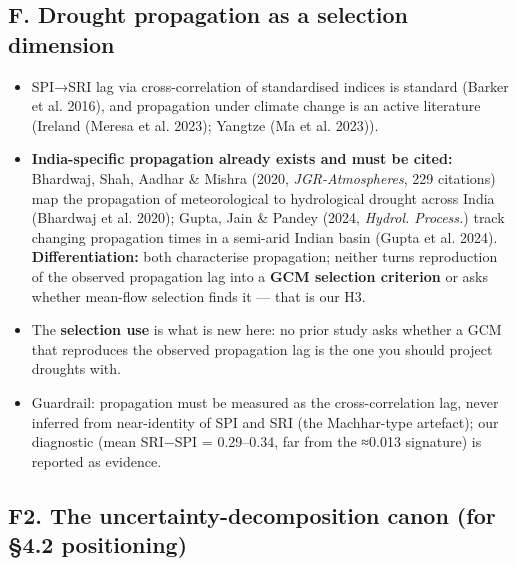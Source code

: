 \documentclass[
  11pt,
]{article}
\providecommand{\tightlist}{%
  \setlength{\itemsep}{0pt}\setlength{\parskip}{0pt}}
\begin{document}
\subsection{F. Drought propagation as a selection
dimension}\label{f.-drought-propagation-as-a-selection-dimension}

\begin{itemize}
\tightlist
\item
  SPI→SRI lag via cross-correlation of standardised indices is standard
  (Barker et al. 2016), and propagation under climate change is an
  active literature (Ireland (Meresa et al. 2023); Yangtze ({Ma et al.}
  2023)).
\item
  \textbf{India-specific propagation already exists and must be cited:}
  Bhardwaj, Shah, Aadhar \& Mishra (2020, \emph{JGR-Atmospheres}, 229
  citations) map the propagation of meteorological to hydrological
  drought across India (Bhardwaj et al. 2020); Gupta, Jain \& Pandey
  (2024, \emph{Hydrol. Process.}) track changing propagation times in a
  semi-arid Indian basin (Gupta et al. 2024). \textbf{Differentiation:}
  both characterise propagation; neither turns reproduction of the
  observed propagation lag into a \textbf{GCM selection criterion} or
  asks whether mean-flow selection finds it --- that is our H3.
\item
  The \textbf{selection use} is what is new here: no prior study asks
  whether a GCM that reproduces the observed propagation lag is the one
  you should project droughts with.
\item
  Guardrail: propagation must be measured as the cross-correlation lag,
  never inferred from near-identity of SPI and SRI (the Machhar-type
  artefact); our diagnostic (mean \textbar SRI−SPI\textbar{} =
  0.29--0.34, far from the ≈0.013 signature) is reported as evidence.
\end{itemize}

\subsection{F2. The uncertainty-decomposition canon (for §4.2
positioning)}\label{f2.-the-uncertainty-decomposition-canon-for-4.2-positioning}
\end{document}
